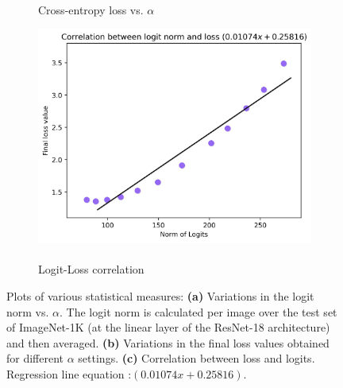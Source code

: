 \documentclass[times,sort&compress]{elsarticle}
\begin{document}
\begin{figure}[t]
\begin{subfigure}{.33\columnwidth}
\caption{\\Cross-entropy loss vs. $\alpha$}
\end{subfigure}%
\begin{subfigure}{.33\columnwidth}
\centering
\includegraphics[width=0.96\columnwidth]{logit_vs_loss}
\caption{\\Logit-Loss correlation}
\end{subfigure}
\caption{ Plots of various statistical measures: \textbf{(a)} Variations in the logit
norm vs. $\alpha$. The logit norm is calculated per image over the test set of
ImageNet-1K (at the linear layer of the ResNet-18 architecture) and then averaged.
\textbf{(b)} Variations in the final loss values obtained for different $\alpha$
settings. \textbf{(c)} Correlation between loss and logits. Regression line equation
:$(0.01074 x + 0.25816)$. }
\label{fig:stats}
\end{figure}
\end{document}

